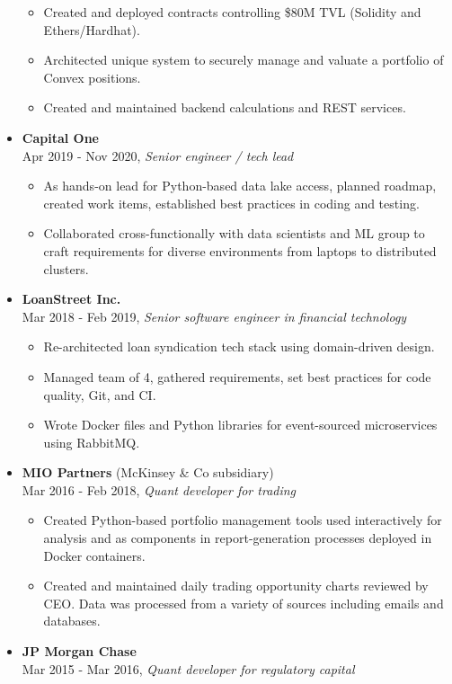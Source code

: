 \documentclass[margin]{res}
\def\tightlist{}
\begin{document}
\begin{resume}
\begin{itemize}
  \begin{itemize}
  \tightlist
  \item
    Created and deployed contracts controlling \$80M TVL (Solidity and
    Ethers/Hardhat).
  \item
    Architected unique system to securely manage and valuate a portfolio
    of Convex positions.
  \item
    Created and maintained backend calculations and REST services.
  \end{itemize}
\item
  \textbf{Capital One}\\
  Apr 2019 - Nov 2020, \emph{Senior engineer / tech lead}

  \begin{itemize}
  \tightlist
  \item
    As hands-on lead for Python-based data lake access, planned roadmap,
    created work items, established best practices in coding and
    testing.
  \item
    Collaborated cross-functionally with data scientists and ML group to
    craft requirements for diverse environments from laptops to
    distributed clusters.
  \end{itemize}
\item
  \textbf{LoanStreet Inc.}\\
  Mar 2018 - Feb 2019, \emph{Senior software engineer in financial
  technology}

  \begin{itemize}
  \tightlist
  \item
    Re-architected loan syndication tech stack using domain-driven
    design.
  \item
    Managed team of 4, gathered requirements, set best practices for
    code quality, Git, and CI.
  \item
    Wrote Docker files and Python libraries for event-sourced
    microservices using RabbitMQ.
  \end{itemize}
\item
  \textbf{MIO Partners} (McKinsey \& Co subsidiary)\\
  Mar 2016 - Feb 2018, \emph{Quant developer for trading}

  \begin{itemize}
  \tightlist
  \item
    Created Python-based portfolio management tools used interactively
    for analysis and as components in report-generation processes
    deployed in Docker containers.
  \item
    Created and maintained daily trading opportunity charts reviewed by
    CEO. Data was processed from a variety of sources including emails
    and databases.
  \end{itemize}
\item
  \textbf{JP Morgan Chase}\\
  Mar 2015 - Mar 2016, \emph{Quant developer for regulatory capital}


\end{itemize}
\end{resume}
\end{document}
